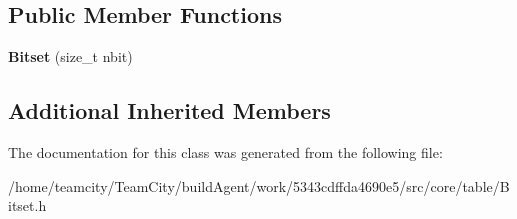 \subsection*{Public Member Functions}
\begin{DoxyCompactItemize}
\item 
{\bfseries Bitset} (size\+\_\+t nbit)\hypertarget{classBitset_abfc9f780afcf5f1595320db5b3a8a51a}{}\label{classBitset_abfc9f780afcf5f1595320db5b3a8a51a}

\end{DoxyCompactItemize}
\subsection*{Additional Inherited Members}


The documentation for this class was generated from the following file\+:\begin{DoxyCompactItemize}
\item 
/home/teamcity/\+Team\+City/build\+Agent/work/5343cdffda4690e5/src/core/table/Bitset.\+h\end{DoxyCompactItemize}
